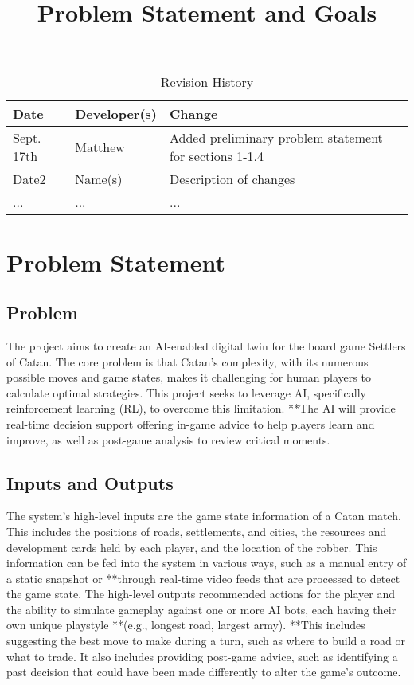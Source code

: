 \documentclass{article}
\title{Problem Statement and Goals\\\progname}
\author{\authname}
\date{}
\begin{document}
\maketitle

\begin{table}[hp]
\caption{Revision History} \label{TblRevisionHistory}
\begin{tabularx}{\textwidth}{llX}
\toprule
\textbf{Date} & \textbf{Developer(s)} & \textbf{Change}\\
\midrule
Sept. 17th & Matthew & Added preliminary problem statement for sections 1-1.4\\
Date2 & Name(s) & Description of changes\\
... & ... & ...\\
\bottomrule
\end{tabularx}
\end{table}

\section{Problem Statement}



\subsection{Problem}
The project aims to create an AI-enabled digital twin for the board game Settlers of Catan. The core problem is that Catan's complexity, with its numerous possible moves and game states, makes it challenging for human players to calculate optimal strategies. This project seeks to leverage AI, specifically reinforcement learning (RL), to overcome this limitation. **The AI will provide real-time decision support offering in-game advice to help players learn and improve, as well as post-game analysis to review critical moments.

\subsection{Inputs and Outputs}
The system's high-level inputs are the game state information of a Catan match. This includes the positions of roads, settlements, and cities, the resources and development cards held by each player, and the location of the robber. This information can be fed into the system in various ways, such as a manual entry of a static snapshot or **through real-time video feeds that are processed to detect the game state. The high-level outputs recommended actions for the player and the ability to simulate gameplay against one or more AI bots, each having their own unique playstyle **(e.g., longest road, largest army). **This includes suggesting the best move to make during a turn, such as where to build a road or what to trade. It also includes providing post-game advice, such as identifying a past decision that could have been made differently to alter the game's outcome.
\end{document}
